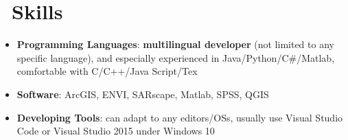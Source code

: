 \documentclass{resume}
\begin{document}
\section{\faCogs\ Skills}
\begin{itemize}[parsep=0.25ex]
  \item \textbf{Programming Languages}:
    \textbf{multilingual developer} (not limited to any specific language),
    and especially experienced in Java/Python/C\#/Matlab,
    comfortable with C/C++/Java Script/Tex

  \item \textbf{Software}:
    ArcGIS, ENVI, SARscape, Matlab, SPSS, QGIS
  
  \item \textbf{Developing Tools}:
    can adapt to any editors/OSs, usually use Visual Studio Code or Visual Studio 2015 under Windows 10
\end{itemize}



%
%
\end{document}
